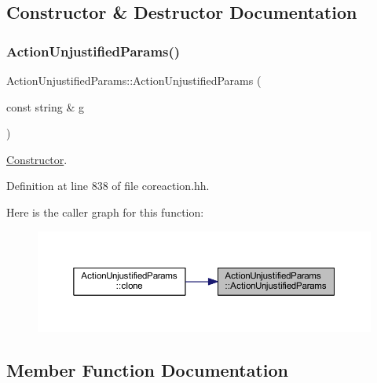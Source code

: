 \subsection{Constructor \& Destructor Documentation}
\mbox{\label{class_action_unjustified_params_aa9ab05dba8cea3e3d8c954483440e0be}} 
\subsubsection{\texorpdfstring{ActionUnjustifiedParams()}{ActionUnjustifiedParams()}}
{\footnotesize\ttfamily Action\+Unjustified\+Params\+::\+Action\+Unjustified\+Params (\begin{DoxyParamCaption}\item[{const string \&}]{g }\end{DoxyParamCaption})\hspace{0.3cm}{\ttfamily [inline]}}



\mbox{\hyperlink{class_constructor}{Constructor}}. 



Definition at line 838 of file coreaction.\+hh.

Here is the caller graph for this function\+:
\nopagebreak
\begin{figure}[H]
\begin{center}
\leavevmode
\includegraphics[width=350pt]{class_action_unjustified_params_aa9ab05dba8cea3e3d8c954483440e0be_icgraph}
\end{center}
\end{figure}


\subsection{Member Function Documentation}
\mbox{\label{class_action_unjustified_params_a76dd93b62ac18bb4d18cba2a79c0ac55}} 
